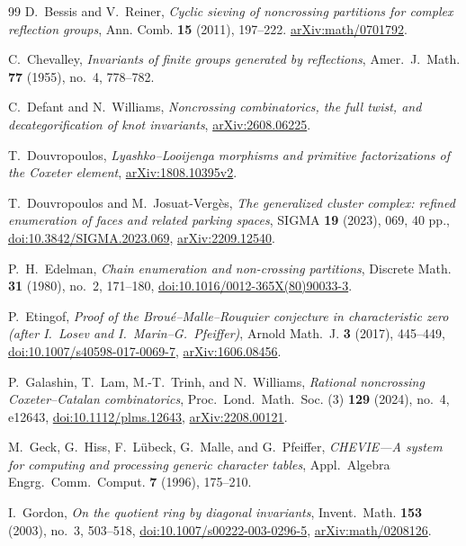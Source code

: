 \documentclass[11pt]{amsart}
\theoremstyle{definition}
\begin{document}
\begin{thebibliography}{99}
D.~Bessis and V.~Reiner,
\emph{Cyclic sieving of noncrossing partitions for complex reflection groups},
Ann. Comb. \textbf{15} (2011), 197--222.
\href{https://arxiv.org/abs/math/0701792}{arXiv:math/0701792}.

C.~Chevalley, \emph{Invariants of finite groups generated by reflections},
Amer.~J.~Math. \textbf{77} (1955), no.~4, 778--782.

C.~Defant and N.~Williams,
\emph{Noncrossing combinatorics, the full twist, and decategorification
of knot invariants},
\href{https://arxiv.org/abs/2608.06225}{arXiv:2608.06225}.

T.~Douvropoulos,
\emph{Lyashko--Looijenga morphisms and primitive factorizations of the Coxeter element},
\href{https://arxiv.org/abs/1808.10395v2}{arXiv:1808.10395v2}.

T.~Douvropoulos and M.~Josuat-Verg\`es,
\emph{The generalized cluster complex: refined enumeration of faces
and related parking spaces},
SIGMA \textbf{19} (2023), 069, 40 pp.,
\href{https://doi.org/10.3842/SIGMA.2023.069}{doi:10.3842/SIGMA.2023.069},
\href{https://arxiv.org/abs/2209.12540}{arXiv:2209.12540}.

P.~H.~Edelman,
\emph{Chain enumeration and non-crossing partitions},
Discrete Math. \textbf{31} (1980), no.~2, 171--180,
\href{https://doi.org/10.1016/0012-365X(80)90033-3}{doi:10.1016/0012-365X(80)90033-3}.

P.~Etingof,
\emph{Proof of the Brou\'e--Malle--Rouquier conjecture in characteristic zero
(after I.~Losev and I.~Marin--G.~Pfeiffer)},
Arnold Math.~J. \textbf{3} (2017), 445--449,
\href{https://doi.org/10.1007/s40598-017-0069-7}{doi:10.1007/s40598-017-0069-7},
\href{https://arxiv.org/abs/1606.08456}{arXiv:1606.08456}.

P.~Galashin, T.~Lam, M.-T.~Trinh, and N.~Williams,
\emph{Rational noncrossing Coxeter--Catalan combinatorics},
Proc.~Lond.~Math.~Soc. (3) \textbf{129} (2024), no.~4, e12643,
\href{https://doi.org/10.1112/plms.12643}{doi:10.1112/plms.12643},
\href{https://arxiv.org/abs/2208.00121}{arXiv:2208.00121}.

M.~Geck, G.~Hiss, F.~L\"ubeck, G.~Malle, and G.~Pfeiffer,
\emph{CHEVIE---A system for computing and processing generic character tables},
Appl.~Algebra Engrg.~Comm.~Comput. \textbf{7} (1996), 175--210.

I.~Gordon,
\emph{On the quotient ring by diagonal invariants},
Invent.~Math. \textbf{153} (2003), no.~3, 503--518,
\href{https://doi.org/10.1007/s00222-003-0296-5}{doi:10.1007/s00222-003-0296-5},
\href{https://arxiv.org/abs/math/0208126}{arXiv:math/0208126}.


\end{thebibliography}
\end{document}
